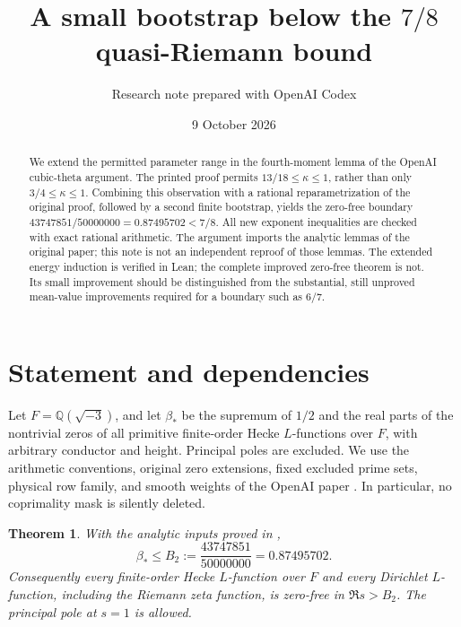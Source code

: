 \documentclass[11pt]{article}
\title{A small bootstrap below the $7/8$ quasi-Riemann bound}
\author{Research note prepared with OpenAI Codex}
\date{9 October 2026}
\newtheorem{theorem}{Theorem}
\newcommand{\F}{\mathbb Q(\sqrt{-3})}
\newcommand{\Bstar}{\beta_*}
\begin{document}
\maketitle

\begin{abstract}
We extend the permitted parameter range in the fourth-moment lemma of the
OpenAI cubic-theta argument. The printed proof permits
$13/18\le\kappa\le1$, rather than only $3/4\le\kappa\le1$.
Combining this observation with a rational reparametrization of the original
proof, followed by a second finite bootstrap, yields the zero-free boundary
$43747851/50000000=0.87495702<7/8$.
All new exponent inequalities are checked with exact rational arithmetic.
The argument imports the analytic lemmas of the original paper; this note
is not an independent reproof of those lemmas. The extended energy
induction is verified in Lean; the complete improved zero-free theorem
is not. Its small improvement should be distinguished from the substantial,
still unproved mean-value improvements required for a boundary such as $6/7$.
\end{abstract}

\section{Statement and dependencies}

Let $F=\F$, and let $\Bstar$ be the supremum of $1/2$ and the real parts
of the nontrivial zeros of all primitive finite-order Hecke $L$-functions
over $F$, with arbitrary conductor and height. Principal poles are excluded.
We use the arithmetic conventions, original zero extensions, fixed excluded
prime sets, physical row family, and smooth weights of the OpenAI paper
\cite{openai}. In particular, no coprimality mask is silently deleted.

\begin{theorem}\label{thm:main}
With the analytic inputs proved in \cite{openai},
\[
 \Bstar\le B_2:=\frac{43747851}{50000000}=0.87495702.
\]
Consequently every finite-order Hecke $L$-function over $F$ and every
Dirichlet $L$-function, including the Riemann zeta function, is zero-free
in $\Re s>B_2$. The principal pole at $s=1$ is allowed.
\end{theorem}
\end{document}
